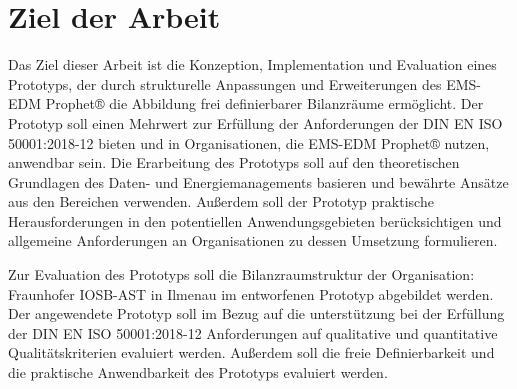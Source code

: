 \section{Ziel der Arbeit}

Das Ziel dieser Arbeit ist die Konzeption, Implementation und Evaluation eines Prototyps, der durch strukturelle Anpassungen und 
Erweiterungen des EMS-EDM Prophet® die Abbildung frei definierbarer Bilanzräume ermöglicht. Der Prototyp soll einen Mehrwert zur 
Erfüllung der Anforderungen der DIN EN ISO 50001:2018-12 bieten und in Organisationen, die EMS-EDM Prophet® nutzen, anwendbar sein. Die Erarbeitung des Prototyps soll 
auf den theoretischen Grundlagen des Daten- und Energiemanagements basieren und bewährte Ansätze aus den Bereichen verwenden. Außerdem soll der 
Prototyp praktische Herausforderungen in den potentiellen Anwendungsgebieten berücksichtigen und allgemeine Anforderungen an Organisationen zu dessen 
Umsetzung formulieren.


Zur Evaluation des Prototyps soll die Bilanzraumstruktur der Organisation: Fraunhofer IOSB-AST in Ilmenau im entworfenen Prototyp abgebildet werden.
Der angewendete Prototyp soll im Bezug auf die unterstützung bei der Erfüllung der DIN EN ISO 50001:2018-12 Anforderungen auf qualitative und quantitative 
Qualitätskriterien evaluiert werden.
Außerdem soll die freie Definierbarkeit und die praktische Anwendbarkeit des Prototyps evaluiert werden.
